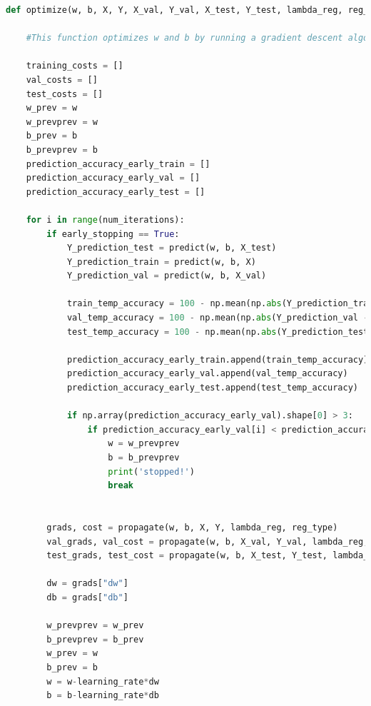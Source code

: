 \documentclass{article} %
\begin{document}
{\begin{lstlisting}[language=Python]
def optimize(w, b, X, Y, X_val, Y_val, X_test, Y_test, lambda_reg, reg_type, num_iterations, learning_rate, print_cost = False, early_stopping = True):

    #This function optimizes w and b by running a gradient descent algorithm
    
    training_costs = []
    val_costs = []
    test_costs = []
    w_prev = w
    w_prevprev = w
    b_prev = b
    b_prevprev = b
    prediction_accuracy_early_train = []
    prediction_accuracy_early_val = []
    prediction_accuracy_early_test = []

    for i in range(num_iterations):
        if early_stopping == True:
            Y_prediction_test = predict(w, b, X_test)
            Y_prediction_train = predict(w, b, X)
            Y_prediction_val = predict(w, b, X_val)
            
            train_temp_accuracy = 100 - np.mean(np.abs(Y_prediction_train - Y)) * 100;
            val_temp_accuracy = 100 - np.mean(np.abs(Y_prediction_val - Y_val)) * 100;
            test_temp_accuracy = 100 - np.mean(np.abs(Y_prediction_test - Y_test)) * 100;
            
            prediction_accuracy_early_train.append(train_temp_accuracy)
            prediction_accuracy_early_val.append(val_temp_accuracy)
            prediction_accuracy_early_test.append(test_temp_accuracy)
            
            if np.array(prediction_accuracy_early_val).shape[0] > 3:
                if prediction_accuracy_early_val[i] < prediction_accuracy_early_val[i-1] and prediction_accuracy_early_val[i-1] < prediction_accuracy_early_val[i-2] and prediction_accuracy_early_val[i-2] < prediction_accuracy_early_val[i-3]:
                    w = w_prevprev
                    b = b_prevprev
                    print('stopped!')
                    break
    
        
        grads, cost = propagate(w, b, X, Y, lambda_reg, reg_type)
        val_grads, val_cost = propagate(w, b, X_val, Y_val, lambda_reg, reg_type)
        test_grads, test_cost = propagate(w, b, X_test, Y_test, lambda_reg, reg_type)
        
        dw = grads["dw"]
        db = grads["db"]
        
        w_prevprev = w_prev
        b_prevprev = b_prev
        w_prev = w
        b_prev = b
        w = w-learning_rate*dw
        b = b-learning_rate*db           
        
        


\end{lstlisting}}
\end{document}

